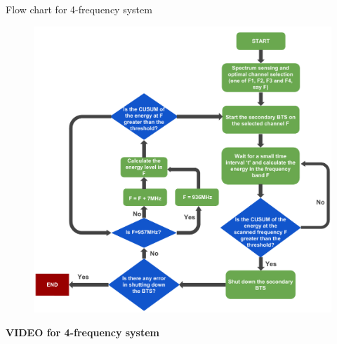 \documentclass{beamer}
\begin{document}
  \begin{frame}{Flow chart for 4-frequency system}
    \begin{figure}
      \centering
      \includegraphics[height=0.9\textheight]{img/freqSys4}
    \end{figure}
  \end{frame}

  \begin{frame}[c]
    \begin{center}
      \LARGE \textbf{VIDEO for 4-frequency system}
    \end{center}
  \end{frame}
    
\end{document}
